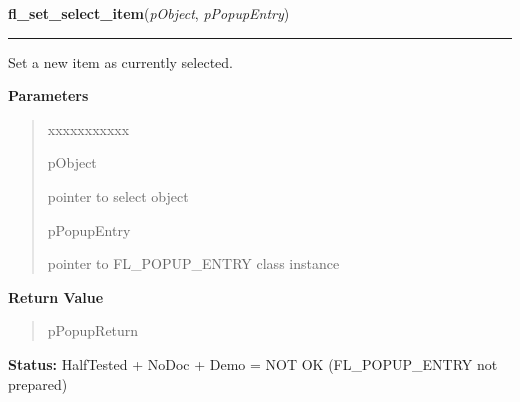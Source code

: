 \hspace{.8\funcindent}\begin{boxedminipage}{\funcwidth}

    \raggedright \textbf{fl\_set\_select\_item}(\textit{pObject}, \textit{pPopupEntry})

    \vspace{-1.5ex}

    \rule{\textwidth}{0.5\fboxrule}
\setlength{\parskip}{2ex}
    Set a new item as currently selected.

\setlength{\parskip}{1ex}
      \textbf{Parameters}
      \vspace{-1ex}

      \begin{quote}
        \begin{Ventry}{xxxxxxxxxxx}

          \item[pObject]

          pointer to select object

          \item[pPopupEntry]

          pointer to FL\_POPUP\_ENTRY class instance

        \end{Ventry}

      \end{quote}

      \textbf{Return Value}
    \vspace{-1ex}

      \begin{quote}
      pPopupReturn

      \end{quote}

\textbf{Status:} HalfTested + NoDoc + Demo = NOT OK (FL\_POPUP\_ENTRY not prepared)



    \end{boxedminipage}

    \label{xformslib:library:fl_get_select_item_by_value}

    \vspace{0.5ex}

